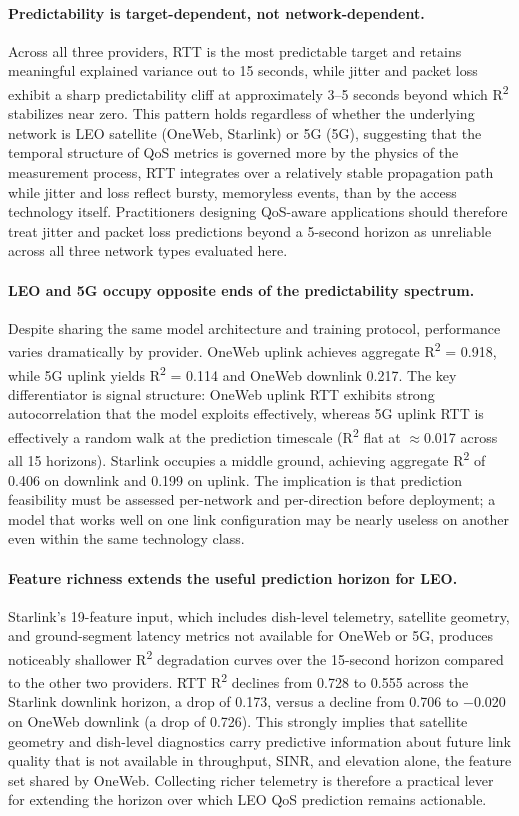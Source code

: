 \documentclass[12pt]{article}
\begin{document}
\paragraph{Predictability is target-dependent, not network-dependent.} Across all three providers, RTT is the most predictable target and retains meaningful explained variance out to 15 seconds, while jitter and packet loss exhibit a sharp predictability cliff at approximately 3--5 seconds beyond which R\textsuperscript{2} stabilizes near zero. This pattern holds regardless of whether the underlying network is LEO satellite (OneWeb, Starlink) or 5G (5G), suggesting that the temporal structure of QoS metrics is governed more by the physics of the measurement process, RTT integrates over a relatively stable propagation path while jitter and loss reflect bursty, memoryless events, than by the access technology itself. Practitioners designing QoS-aware applications should therefore treat jitter and packet loss predictions beyond a 5-second horizon as unreliable across all three network types evaluated here.

\paragraph{LEO and 5G occupy opposite ends of the predictability spectrum.} Despite sharing the same model architecture and training protocol, performance varies dramatically by provider. OneWeb uplink achieves aggregate R\textsuperscript{2} = 0.918,
while 5G uplink yields R\textsuperscript{2} = 0.114 and OneWeb downlink 0.217. The key differentiator is signal structure: OneWeb uplink RTT exhibits strong autocorrelation that the model exploits effectively, whereas 5G uplink RTT is
effectively a random walk at the prediction timescale (R\textsuperscript{2} flat at $\approx$0.017 across all 15 horizons). Starlink occupies a middle ground, achieving aggregate R\textsuperscript{2} of 0.406 on downlink and 0.199 on uplink. The implication is that prediction feasibility must be assessed per-network and per-direction before deployment; a model that works well on one link configuration may be nearly useless on another even within the same technology class.

\paragraph{Feature richness extends the useful prediction horizon for LEO.} Starlink's 19-feature input, which includes dish-level telemetry, satellite geometry, and ground-segment latency metrics not available for OneWeb or 5G, produces
noticeably shallower R\textsuperscript{2} degradation curves over the 15-second horizon compared to the other two providers. RTT R\textsuperscript{2} declines from 0.728 to 0.555 across the Starlink downlink horizon, a drop of 0.173, versus a decline from 0.706 to $-$0.020 on OneWeb downlink (a drop of 0.726). This strongly implies that satellite geometry and dish-level diagnostics carry predictive information about future link quality that is not available in throughput, SINR, and elevation alone, the feature set shared by OneWeb. Collecting richer telemetry is therefore a practical lever for extending the horizon over which LEO QoS prediction remains actionable.
\end{document}
